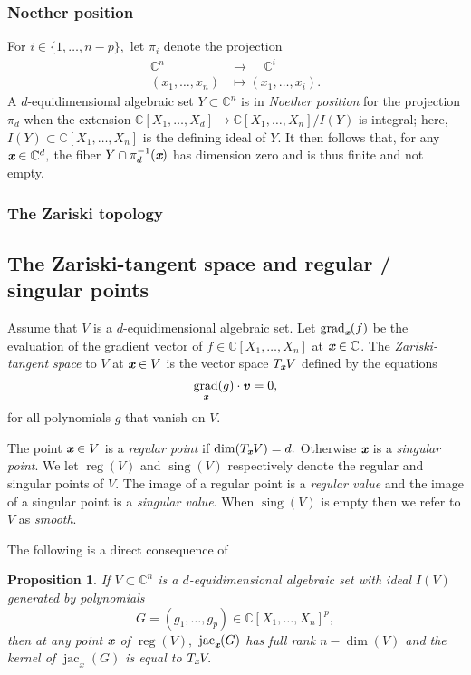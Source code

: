 \documentclass[a4paper]{article}
\def\xb{\textit{\textbf{x}}}
\DeclareMathOperator{\sing}{sing}
\DeclareMathOperator{\jac}{jac}
\DeclareMathOperator{\grad}{grad}
\DeclareMathOperator{\reg}{reg}
\def\C{\mathbb{C}}
\newtheorem{prop}[theorem]{Proposition}
\begin{document}
\subsubsection{Noether position}
For $i \in
\{1,\hdots,n-p\},$  let $\pi_i$ denote the projection 
%
\begin{align*}
\C^n~~~~~ &\rightarrow~~~~~ \C^i \\
(x_1,\hdots,x_n) &\mapsto  (x_1,\hdots,x_i).    
\end{align*} 
A $d$-equidimensional algebraic set $Y \subset \C^n$ is in \textit{Noether position} for the projection
$\pi_d$ when the extension $\C[X_1,\hdots,X_{d}] \rightarrow
\C[X_1,\hdots,X_n]/I(Y)$ is integral; here, $I(Y) \subset
\C[X_1,\hdots,X_n]$ is the defining ideal of $Y$. It then follows that, for any $\xb \in \C^d,$ the fiber $Y \cap \pi_d^{-1}(\xb)$ has dimension zero and is thus finite and not empty.


\subsubsection{The Zariski topology}


\subsection{The Zariski-tangent space and regular / singular points}
Assume that $V$ is a $d$-equidimensional algebraic set. Let $\grad_{\xb}(f)$ be the evaluation of the gradient vector of $f \in \C[X_1,\hdots,X_n]$ at $\xb \in \C$. The \textit{Zariski-tangent space} to $V$ at $\xb \in V$ is the vector space $T_{\xb}V$ defined by the equations 
\[
\grad_{\xb} (g) \cdot \bm v = 0,
\] 
for all polynomials $g$ that vanish on $V$. 
\par 
The point $\xb \in V$ is a \textit{regular point} if $\dim (T_{\xb}V) = d.$ Otherwise $\xb$ is a \textit{singular point}. We let $\reg(V)$ and $\sing(V)$ respectively denote the regular and singular points of $V$. The image of a regular point is a \textit{regular value} and the image of a singular point is a \textit{singular value}. When $\sing(V)$ is empty then we refer to $V$ as \textit{smooth}.
%
\par 
The following is a direct consequence of \cite[Corollary 16.20]{ECA}
%
\begin{prop}
If $V \subset \C^n$ is a $d$-equidimensional algebraic set with ideal $I(V)$ generated by polynomials 
\[
G=(g_1,\hdots,g_p) \in \C[X_1,\hdots,X_n]^p,
\]
then at any point $\xb$ of $\reg(V),$ $\jac_{\xb}(G)$ has full rank $n - \dim(V)$ and the kernel of $\jac_x(G)$ is equal to $T_{\xb}V.$ 
\end{prop}
%
\end{document}
